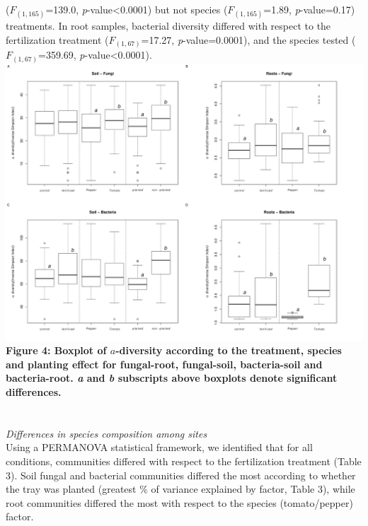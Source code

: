 \documentclass[11pt,]{article}
\begin{document}
(\(F_{(1,165)}\)=139.0, \emph{p}-value\textless{}0.0001) but not species
(\(F_{(1,165)}\)=1.89, \emph{p}-value=0.17) treatments. In root samples,
bacterial diversity differed with respect to the fertilization treatment
(\(F_{(1,67)}\)=17.27, \emph{p}-value=0.0001), and the species tested
(\(F_{(1,67)}\)=359.69, \emph{p}-value\textless{}0.0001). ~\\
\includegraphics[width=6.25000in]{../figures/Figure5_alpha.pdf}\\
\textbf{Figure 4: Boxplot of \(a\)-diversity according to the treatment,
species and planting effect for fungal-root, fungal-soil, bacteria-soil
and bacteria-root. \emph{a} and \emph{b} subscripts above boxplots
denote significant differences.}\\
\hspace*{0.333em}\\
\hspace*{0.333em}\\
\emph{Differences in species composition among sites}\\
Using a PERMANOVA statistical framework, we identified that for all
conditions, communities differed with respect to the fertilization
treatment (Table 3). Soil fungal and bacterial communities differed the
most according to whether the tray was planted (greatest \% of variance
explained by factor, Table 3), while root communities differed the most
with respect to the species (tomato/pepper) factor.
\end{document}
